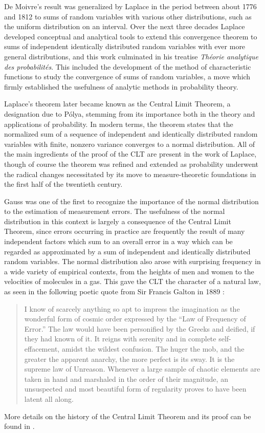 \documentclass{svjour3}
\begin{document}
De Moivre's result was generalized by Laplace in the period between about 1776 and 1812 to sums of random variables with various other distributions, such as the uniform distribution on an interval. Over the next three decades Laplace developed conceptual and analytical tools to extend this convergence theorem to sums of independent identically distributed random variables with ever more general distributions, and this work culminated in his treatise {\em Th\'eorie analytique des probabilit\'es}. This included the development of the method of characteristic functions to study the convergence of sums of random variables, a move which firmly established the usefulness of analytic methods in probability theory.

Laplace's theorem later became known as the Central Limit Theorem, a designation due to P\'olya, stemming from its importance both in the theory and applications of probability. In modern terms, the theorem states that the normalized sum of a sequence of independent and identically distributed random variables with finite, nonzero variance converges to a normal distribution. All of the main ingredients of the proof of the CLT are present in the work of Laplace, though of course the theorem was refined and extended as probability underwent the radical changes necessitated by its move to measure-theoretic foundations in the first half of the twentieth century.

Gauss was one of the first to recognize the importance of the normal distribution to the estimation of measurement errors. The usefulness of the normal distribution in this context is largely a consequence of the Central Limit Theorem, since errors occurring in practice are frequently the result of many independent factors which sum to an overall error in a way which can be regarded as approximated by a sum of independent and identically distributed random variables. The normal distribution also arose with surprising frequency in a wide variety of empirical contexts, from the heights of men and women to the velocities of molecules in a gas. This gave the CLT the character of a natural law, as seen in the following poetic quote from Sir Francis Galton in 1889 \cite{galton:89}:
\begin{quote}
 I know of scarcely anything so apt to impress the imagination as the wonderful form of cosmic order expressed by the ``Law of Frequency of Error.'' The law would have been personified by the Greeks and deified, if they had known of it. It reigns with serenity and in complete self-effacement, amidst the wildest confusion. The huger the mob, and the greater the apparent anarchy, the more perfect is its sway. It is the supreme law of Unreason. Whenever a large sample of chaotic elements are taken in hand and marshaled in the order of their magnitude, an unsuspected and most beautiful form of regularity proves to have been latent all along.
\end{quote}
More details on the history of the Central Limit Theorem and its proof can be found in \cite{fischer:11}.
\end{document}
